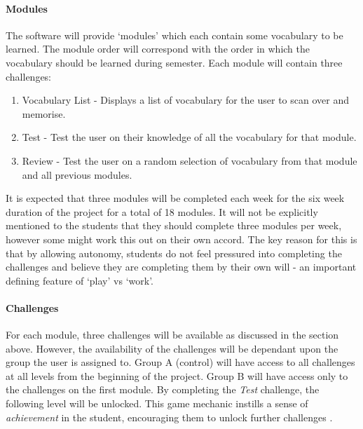 \paragraph{Modules}
The software will provide `modules' which each contain some vocabulary to be learned.
The module order will correspond with the order in which the vocabulary should
be learned during semester. Each module will contain three challenges:
\begin{enumerate}
	\item Vocabulary List - Displays a list of vocabulary for the user to scan
		over and memorise.
	\item Test - Test the user on their knowledge of all the vocabulary for
		that module.
	\item Review - Test the user on a random selection of vocabulary from that
		module and all previous modules.
\end{enumerate}

It is expected that three modules will be completed each week for the six week
duration of the project for a total of 18 modules. It will not be explicitly
mentioned to the students that they should complete three modules per week,
however some might work this out on their own accord.
The key reason for this is that by allowing autonomy, students do not feel 
pressured into completing the challenges and believe they are completing them 
by their own will - an important defining feature of `play' vs `work'\cite{sebastian_deterding_meaningful_2011}.

\paragraph{Challenges}
For each module, three challenges will be available as discussed in the section
above. However, the availability of the challenges will be dependant upon the
group the user is assigned to. Group A (control) will have access to all
challenges at all levels from the beginning of the project. Group B will have
access only to the challenges on the first module. By completing the \textit{Test}
challenge, the following level will be unlocked. This game mechanic instills
a sense of \textit{achievement} in the student, encouraging them to unlock further
challenges \cite{gabe_zichermann_fun_2010}.


